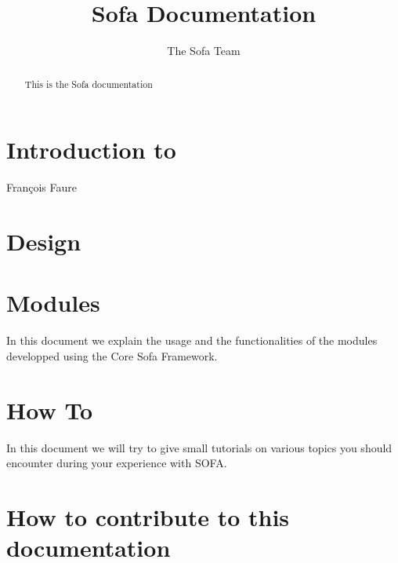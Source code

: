 \documentclass[a4paper,10pt]{report}
\title{Sofa Documentation}
\author{The Sofa Team}
\begin{document}
\maketitle

\begin{abstract}
This is the Sofa documentation
\end{abstract}

\tableofcontents

\chapter{Introduction to \sofa}
Fran\c{c}ois Faure

\graphicspath{{../introduction/}}  %


\chapter{Design}
\graphicspath{{../design/}}  %



\chapter{Modules}
\graphicspath{{../modules/}}  %
In this document we explain the usage and the functionalities of the modules developped using the Core Sofa Framework.


\chapter{How To}
\graphicspath{{../HowTo/}}  %
In this document we will try to give small tutorials on various topics you should encounter during your experience with SOFA.




\chapter{How to contribute to this documentation}
\end{document}
